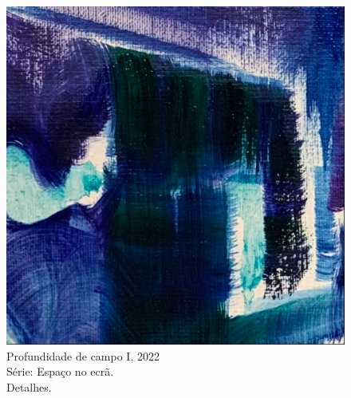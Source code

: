 \begin{figure}
\begin{minipage}{.91\linewidth}
\begin{minipage}{.3\linewidth}
\end{minipage}
\hfill
\begin{minipage}{.3\linewidth}
	\includegraphics[width = \linewidth]{apendice/pinturas-finalizadas/boudet-profundidade-campo-i-detalhe3.pdf}
\end{minipage}
\caption*{Profundidade de campo I, 2022 \\ Série: Espaço no ecrã. \\ Detalhes.}
\end{minipage}
\end{figure}

\clearpage

